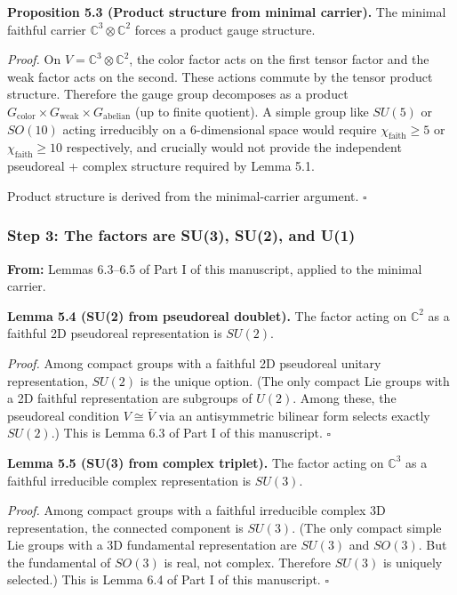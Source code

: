 \textbf{Proposition 5.3 (Product structure from minimal carrier).} The minimal faithful carrier \(\mathbb{C}^3 \otimes \mathbb{C}^2\) forces a product gauge structure.

\emph{Proof.} On \(V = \mathbb{C}^3 \otimes \mathbb{C}^2\), the color factor acts on the first tensor factor and the weak factor acts on the second. These actions commute by the tensor product structure. Therefore the gauge group decomposes as a product \(G_{\mathrm{color}} \times G_{\mathrm{weak}} \times G_{\mathrm{abelian}}\) (up to finite quotient). A simple group like \(SU(5)\) or \(SO(10)\) acting irreducibly on a 6-dimensional space would require \(\chi_{\mathrm{faith}} \geq 5\) or \(\chi_{\mathrm{faith}} \geq 10\) respectively, and crucially would not provide the independent pseudoreal + complex structure required by Lemma 5.1.

Product structure is derived from the minimal-carrier argument. \(\square\)

\subsubsection{Step 3: The factors are SU(3), SU(2), and U(1)}\label{step-3-the-factors-are-su3-su2-and-u1}

\textbf{From:} Lemmas 6.3--6.5 of Part I of this manuscript, applied to the minimal carrier.

\textbf{Lemma 5.4 (SU(2) from pseudoreal doublet).} The factor acting on \(\mathbb{C}^2\) as a faithful 2D pseudoreal representation is \(SU(2)\).

\emph{Proof.} Among compact groups with a faithful 2D pseudoreal unitary representation, \(SU(2)\) is the unique option. (The only compact Lie groups with a 2D faithful representation are subgroups of \(U(2)\). Among these, the pseudoreal condition \(V \cong \bar{V}\) via an antisymmetric bilinear form selects exactly \(SU(2)\).) This is Lemma 6.3 of Part I of this manuscript. \(\square\)

\textbf{Lemma 5.5 (SU(3) from complex triplet).} The factor acting on \(\mathbb{C}^3\) as a faithful irreducible complex representation is \(SU(3)\).

\emph{Proof.} Among compact groups with a faithful irreducible complex 3D representation, the connected component is \(SU(3)\). (The only compact simple Lie groups with a 3D fundamental representation are \(SU(3)\) and \(SO(3)\). But the fundamental of \(SO(3)\) is real, not complex. Therefore \(SU(3)\) is uniquely selected.) This is Lemma 6.4 of Part I of this manuscript. \(\square\)

